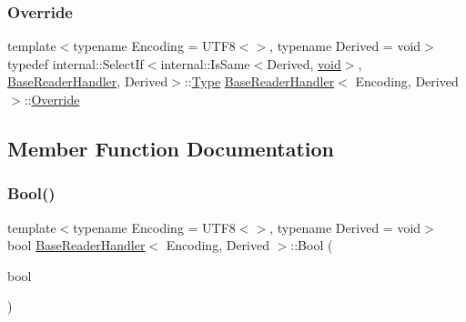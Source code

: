 \mbox{\label{structBaseReaderHandler_a7b6c70d9bf7483b2de5d249f1593776a}} 
\subsubsection{\texorpdfstring{Override}{Override}}
{\footnotesize\ttfamily template$<$typename Encoding = U\+T\+F8$<$$>$, typename Derived = void$>$ \\
typedef internal\+::\+Select\+If$<$internal\+::\+Is\+Same$<$Derived, \hyperlink{imgui__impl__opengl3__loader_8h_ac668e7cffd9e2e9cfee428b9b2f34fa7}{void}$>$, \hyperlink{structBaseReaderHandler}{Base\+Reader\+Handler}, Derived$>$\+::\hyperlink{rapidjson_8h_a1d1cfd8ffb84e947f82999c682b666a7}{Type} \hyperlink{structBaseReaderHandler}{Base\+Reader\+Handler}$<$ Encoding, Derived $>$\+::\hyperlink{structBaseReaderHandler_a7b6c70d9bf7483b2de5d249f1593776a}{Override}}



\subsection{Member Function Documentation}
\mbox{\label{structBaseReaderHandler_aa1c3ce42dbb856b3349792dc9d963587}} 
\subsubsection{\texorpdfstring{Bool()}{Bool()}}
{\footnotesize\ttfamily template$<$typename Encoding = U\+T\+F8$<$$>$, typename Derived = void$>$ \\
bool \hyperlink{structBaseReaderHandler}{Base\+Reader\+Handler}$<$ Encoding, Derived $>$\+::Bool (\begin{DoxyParamCaption}\item[{bool}]{ }\end{DoxyParamCaption})\hspace{0.3cm}{\ttfamily [inline]}}

\mbox{\label{structBaseReaderHandler_a836437f6ccc37f08ff933f009b18a78c}} 
